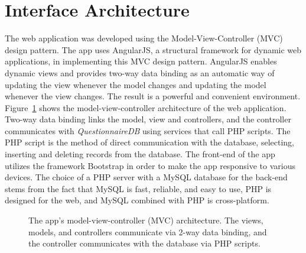 \documentclass{higrep}
\newcommand{\figureref}[1]{Figure~\ref{#1}}
\begin{document}
\section{Interface Architecture}
The web application was developed using the Model-View-Controller (MVC) design pattern. The app uses AngularJS, a structural framework for dynamic web applications, in implementing this MVC design pattern. AngularJS enables dynamic views and provides two-way data binding as an automatic way of updating the view whenever the model changes and updating the model whenever the view changes. The result is a powerful and convenient environment. \figureref{Fig:MVC} shows the model-view-controller architecture of the web application. Two-way data binding links the model, view and controllers, and the controller communicates with \textit{QuestionnaireDB} using services that call PHP scripts. The PHP script is the method of direct communication with the database, selecting, inserting and deleting records from the database. The front-end of the app utilizes the framework Bootstrap in order to make the app responsive to various devices. The choice of a PHP server with a MySQL database for the back-end stems from the fact that MySQL is fast, reliable, and easy to use, PHP is designed for the web, and MySQL combined with PHP is cross-platform.

\begin{figure}[htbp]
  \centering
  \caption{The app's model-view-controller (MVC) architecture. The views, models, and controllers communicate via 2-way data binding, and the controller communicates with the database via PHP scripts.} \label{Fig:MVC}
\end{figure}
\end{document}

